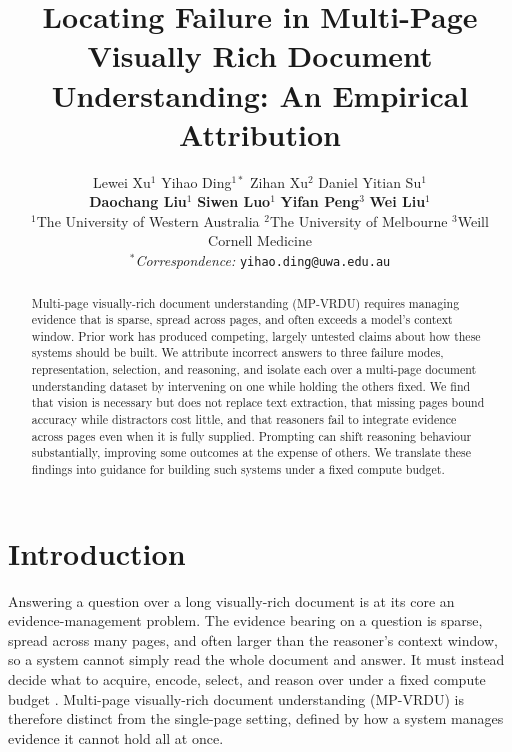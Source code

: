 \documentclass[11pt]{article}
\title{Locating Failure in Multi-Page Visually Rich Document Understanding: An Empirical Attribution}
\author{Lewei Xu$^{1}$ \quad Yihao Ding$^{1*}$ \quad Zihan Xu$^{2}$ \quad Daniel Yitian Su$^{1}$ \\ \textbf{Daochang Liu}$^{1}$ \quad \textbf{Siwen Luo}$^{1}$ \quad \textbf{Yifan Peng}$^{3}$ \quad \textbf{Wei Liu}$^{1}$ \\ $^{1}$The University of Western Australia \quad $^{2}$The University of Melbourne \quad $^{3}$Weill Cornell Medicine \\
  $^*$\textit{Correspondence:}
  \texttt{yihao.ding@uwa.edu.au}
}
\begin{document}
\maketitle

\begin{abstract}
Multi-page visually-rich document understanding (MP-VRDU) requires managing evidence that is sparse, spread across pages, and often exceeds a model's context window. Prior work has produced competing, largely untested claims about how these systems should be built. We attribute incorrect answers to three failure modes, representation, selection, and reasoning, and isolate each over a multi-page document understanding dataset by intervening on one while holding the others fixed. We find that vision is necessary but does not replace text extraction, that missing pages bound accuracy while distractors cost little, and that reasoners fail to integrate evidence across pages even when it is fully supplied. Prompting can shift reasoning behaviour substantially, improving some outcomes at the expense of others. We translate these findings into guidance for building such systems under a fixed compute budget.
\end{abstract}

\section{Introduction}

Answering a question over a long visually-rich document is at its core an evidence-management problem. The evidence bearing on a question is sparse, spread across many pages, and often larger than the reasoner's context window, so a system cannot simply read the whole document and answer. It must instead decide what to acquire, encode, select, and reason over under a fixed compute budget \citep{xu2026managing}. Multi-page visually-rich document understanding (MP-VRDU) is therefore distinct from the single-page setting, defined by how a system manages evidence it cannot hold all at once.
\end{document}
